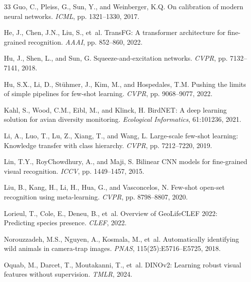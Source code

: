 \begin{thebibliography}{33}
Guo, C., Pleiss, G., Sun, Y., and Weinberger, K.Q.
\newblock On calibration of modern neural networks.
\newblock \emph{ICML}, pp. 1321--1330, 2017.

He, J., Chen, J.N., Liu, S., et~al.
\newblock TransFG: A transformer architecture for fine-grained recognition.
\newblock \emph{AAAI}, pp. 852--860, 2022.

Hu, J., Shen, L., and Sun, G.
\newblock Squeeze-and-excitation networks.
\newblock \emph{CVPR}, pp. 7132--7141, 2018.

Hu, S.X., Li, D., St{\"u}hmer, J., Kim, M., and Hospedales, T.M.
\newblock Pushing the limits of simple pipelines for few-shot learning.
\newblock \emph{CVPR}, pp. 9068--9077, 2022.

Kahl, S., Wood, C.M., Eibl, M., and Klinck, H.
\newblock BirdNET: A deep learning solution for avian diversity monitoring.
\newblock \emph{Ecological Informatics}, 61:101236, 2021.

Li, A., Luo, T., Lu, Z., Xiang, T., and Wang, L.
\newblock Large-scale few-shot learning: Knowledge transfer with class hierarchy.
\newblock \emph{CVPR}, pp. 7212--7220, 2019.

Lin, T.Y., RoyChowdhury, A., and Maji, S.
\newblock Bilinear CNN models for fine-grained visual recognition.
\newblock \emph{ICCV}, pp. 1449--1457, 2015.

Liu, B., Kang, H., Li, H., Hua, G., and Vasconcelos, N.
\newblock Few-shot open-set recognition using meta-learning.
\newblock \emph{CVPR}, pp. 8798--8807, 2020.

Lorieul, T., Cole, E., Deneu, B., et~al.
\newblock Overview of GeoLifeCLEF 2022: Predicting species presence.
\newblock \emph{CLEF}, 2022.

Norouzzadeh, M.S., Nguyen, A., Kosmala, M., et~al.
\newblock Automatically identifying wild animals in camera-trap images.
\newblock \emph{PNAS}, 115(25):E5716--E5725, 2018.

Oquab, M., Darcet, T., Moutakanni, T., et~al.
\newblock DINOv2: Learning robust visual features without supervision.
\newblock \emph{TMLR}, 2024.


\end{thebibliography}
